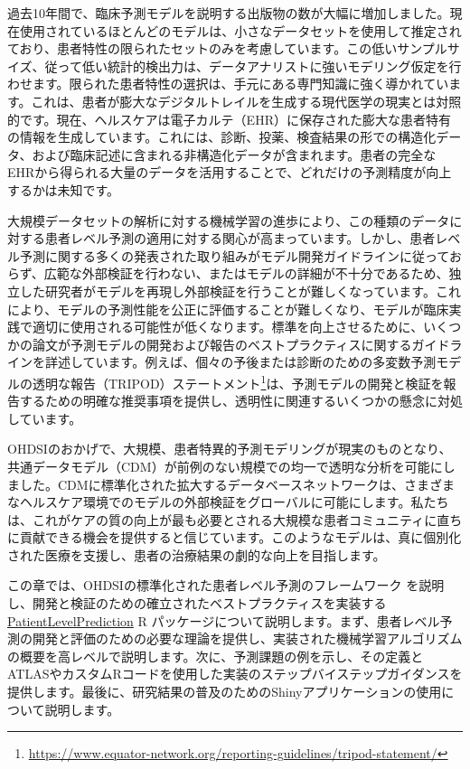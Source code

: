 \documentclass[
  11pt]{book}
\theoremstyle{definition}
\theoremstyle{definition}
\theoremstyle{definition}
\theoremstyle{definition}
\theoremstyle{remark}
\begin{document}
過去10年間で、臨床予測モデルを説明する出版物の数が大幅に増加しました。現在使用されているほとんどのモデルは、小さなデータセットを使用して推定されており、患者特性の限られたセットのみを考慮しています。この低いサンプルサイズ、従って低い統計的検出力は、データアナリストに強いモデリング仮定を行わせます。限られた患者特性の選択は、手元にある専門知識に強く導かれています。これは、患者が膨大なデジタルトレイルを生成する現代医学の現実とは対照的です。現在、ヘルスケアは電子カルテ（EHR）に保存された膨大な患者特有の情報を生成しています。これには、診断、投薬、検査結果の形での構造化データ、および臨床記述に含まれる非構造化データが含まれます。患者の完全なEHRから得られる大量のデータを活用することで、どれだけの予測精度が向上するかは未知です。 

大規模データセットの解析に対する機械学習の進歩により、この種類のデータに対する患者レベル予測の適用に対する関心が高まっています。しかし、患者レベル予測に関する多くの発表された取り組みがモデル開発ガイドラインに従っておらず、広範な外部検証を行わない、またはモデルの詳細が不十分であるため、独立した研究者がモデルを再現し外部検証を行うことが難しくなっています。これにより、モデルの予測性能を公正に評価することが難しくなり、モデルが臨床実践で適切に使用される可能性が低くなります。標準を向上させるために、いくつかの論文が予測モデルの開発および報告のベストプラクティスに関するガイドラインを詳述しています。例えば、個々の予後または診断のための多変数予測モデルの透明な報告（TRIPOD）ステートメント\footnote{\url{https://www.equator-network.org/reporting-guidelines/tripod-statement/}}は、予測モデルの開発と検証を報告するための明確な推奨事項を提供し、透明性に関連するいくつかの懸念に対処しています。  

OHDSIのおかげで、大規模、患者特異的予測モデリングが現実のものとなり、共通データモデル（CDM）が前例のない規模での均一で透明な分析を可能にしました。CDMに標準化された拡大するデータベースネットワークは、さまざまなヘルスケア環境でのモデルの外部検証をグローバルに可能にします。私たちは、これがケアの質の向上が最も必要とされる大規模な患者コミュニティに直ちに貢献できる機会を提供すると信じています。このようなモデルは、真に個別化された医療を支援し、患者の治療結果の劇的な向上を目指します。

この章では、OHDSIの標準化された患者レベル予測のフレームワーク \citep[ ]{reps2018}を説明し、開発と検証のための確立されたベストプラクティスを実装する \href{https://ohdsi.github.io/PatientLevelPrediction/}{PatientLevelPrediction} R パッケージについて説明します。まず、患者レベル予測の開発と評価のための必要な理論を提供し、実装された機械学習アルゴリズムの概要を高レベルで説明します。次に、予測課題の例を示し、その定義とATLASやカスタムRコードを使用した実装のステップバイステップガイダンスを提供します。最後に、研究結果の普及のためのShinyアプリケーションの使用について説明します。
\end{document}
